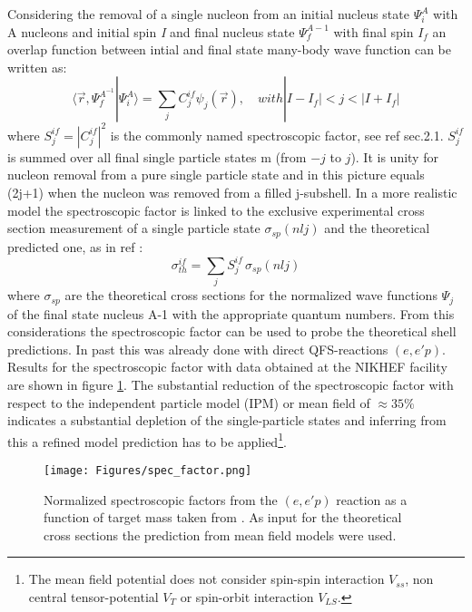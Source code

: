 Considering the removal of a single nucleon from an initial nucleus state $\Psi^A_i$ with A nucleons and initial spin \textit{I} and final nucleus state  $\Psi^{A-1}_f$ with final spin $I_f$ an overlap function between intial and final state many-body wave function can be written as:
\begin{equation}
\langle \vec{r}, \Psi_f^{A^{-1}} | \Psi_i^A \rangle = \sum_j C_j^{if} \psi_j(\vec{r}), \quad with  |I - I_f| < j < |I + I_f|
\end{equation}
where $S_j^{if} = |C_j^{if}|^2$ is the commonly named spectroscopic factor, see ref \cite{hansen2003direct} sec.2.1. $S_j^{if}$ is summed over all final single particle states m (from $-j$ to $j$). It is unity for nucleon removal from a pure single particle state and in this picture equals (2j+1) when the nucleon was removed from a filled j-subshell.
In a more realistic model the spectroscopic factor is linked to the exclusive experimental cross section measurement of a single particle state $\sigma_{sp}(nlj)$ and the theoretical predicted one, as in ref \cite{hansen2003direct}:
\begin{equation}
\sigma_{th}^{if} = \sum_j S_j^{if}\,\sigma_{sp}(nlj)
\end{equation}
where $\sigma_{sp}$ are the theoretical cross sections for the normalized wave functions $\Psi_j$ of the final state nucleus A-1 with the appropriate quantum numbers.\newline
From this considerations the spectroscopic factor can be used to probe the theoretical shell predictions. In past this was already done with direct QFS-reactions $(e,e'p)$. Results for the spectroscopic factor with data obtained at the NIKHEF facility are shown in figure \ref{fig:spec_fac}. The substantial reduction of the spectroscopic factor with respect to the independent particle model (IPM) or mean field of $\approx 35\%$ indicates a substantial depletion of the single-particle states and inferring from this a refined model prediction has to be applied\footnote{The mean field potential does not consider spin-spin interaction $V_{ss}$, non central tensor-potential $V_T$ or spin-orbit interaction $V_{LS}$.}.\newline
\begin{figure}[h!]
    \centering
    \texttt{[image: Figures/spec\_factor.png]}
    \caption{Normalized spectroscopic factors from the $(e,e'p)$ reaction as a function of target mass taken from \cite{DICKHOFF2004377}. As input for the theoretical cross sections the prediction from mean field models were used. }
    \label{fig:spec_fac}
\end{figure}
